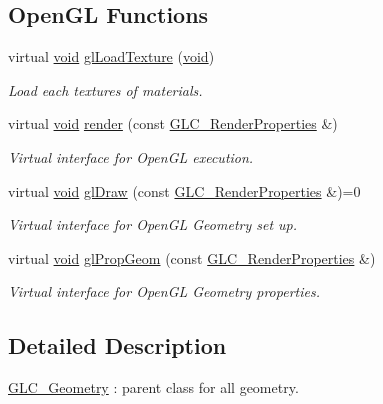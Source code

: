 \subsection*{Open\-G\-L Functions}
\begin{DoxyCompactItemize}
\item 
virtual \hyperlink{group___u_a_v_objects_plugin_ga444cf2ff3f0ecbe028adce838d373f5c}{void} \hyperlink{class_g_l_c___geometry_a4232405e145f383f46f84f04bf752133}{gl\-Load\-Texture} (\hyperlink{group___u_a_v_objects_plugin_ga444cf2ff3f0ecbe028adce838d373f5c}{void})
\begin{DoxyCompactList}\small\item\em Load each textures of materials. \end{DoxyCompactList}\item 
virtual \hyperlink{group___u_a_v_objects_plugin_ga444cf2ff3f0ecbe028adce838d373f5c}{void} \hyperlink{class_g_l_c___geometry_ab1da35d36ff75c6bcdbc90a5080b68a8}{render} (const \hyperlink{class_g_l_c___render_properties}{G\-L\-C\-\_\-\-Render\-Properties} \&)
\begin{DoxyCompactList}\small\item\em Virtual interface for Open\-G\-L execution. \end{DoxyCompactList}\item 
virtual \hyperlink{group___u_a_v_objects_plugin_ga444cf2ff3f0ecbe028adce838d373f5c}{void} \hyperlink{class_g_l_c___geometry_a77780d296ce0bd4e392d219a43782eda}{gl\-Draw} (const \hyperlink{class_g_l_c___render_properties}{G\-L\-C\-\_\-\-Render\-Properties} \&)=0
\begin{DoxyCompactList}\small\item\em Virtual interface for Open\-G\-L Geometry set up. \end{DoxyCompactList}\item 
virtual \hyperlink{group___u_a_v_objects_plugin_ga444cf2ff3f0ecbe028adce838d373f5c}{void} \hyperlink{class_g_l_c___geometry_a5766e264e601a59272b662d8f5411a82}{gl\-Prop\-Geom} (const \hyperlink{class_g_l_c___render_properties}{G\-L\-C\-\_\-\-Render\-Properties} \&)
\begin{DoxyCompactList}\small\item\em Virtual interface for Open\-G\-L Geometry properties. \end{DoxyCompactList}\end{DoxyCompactItemize}


\subsection{Detailed Description}
\hyperlink{class_g_l_c___geometry}{G\-L\-C\-\_\-\-Geometry} \-: parent class for all geometry. 

